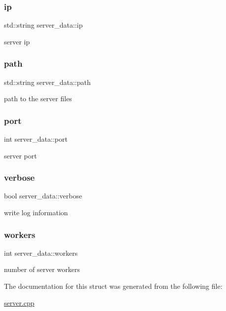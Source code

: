 \subsubsection{\texorpdfstring{ip}{ip}}
{\footnotesize\ttfamily std\+::string server\+\_\+data\+::ip}

server ip \mbox{\label{structserver__data_abc29ec2aa302ea07cf1f6f741e10adbf}} 
\subsubsection{\texorpdfstring{path}{path}}
{\footnotesize\ttfamily std\+::string server\+\_\+data\+::path}

path to the server files \mbox{\label{structserver__data_add87bd108ad6a8709eae3accbc4b3548}} 
\subsubsection{\texorpdfstring{port}{port}}
{\footnotesize\ttfamily int server\+\_\+data\+::port}

server port \mbox{\label{structserver__data_ac97d9c5dce9db24cef22b6832a5fe55a}} 
\subsubsection{\texorpdfstring{verbose}{verbose}}
{\footnotesize\ttfamily bool server\+\_\+data\+::verbose}

write log information \mbox{\label{structserver__data_a2bc2eb5db424b921022b97bee01d79f8}} 
\subsubsection{\texorpdfstring{workers}{workers}}
{\footnotesize\ttfamily int server\+\_\+data\+::workers}

number of server workers 

The documentation for this struct was generated from the following file\+:\begin{DoxyCompactItemize}
\item 
\mbox{\hyperlink{server_8cpp}{server.\+cpp}}\end{DoxyCompactItemize}
